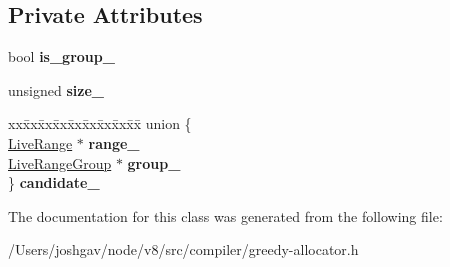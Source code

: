 \subsection*{Private Attributes}
\begin{DoxyCompactItemize}
\item 
bool {\bfseries is\+\_\+group\+\_\+}\hypertarget{classv8_1_1internal_1_1compiler_1_1_allocation_candidate_a728739b4eb20f6cd6e5f22e08bad5d4a}{}\label{classv8_1_1internal_1_1compiler_1_1_allocation_candidate_a728739b4eb20f6cd6e5f22e08bad5d4a}

\item 
unsigned {\bfseries size\+\_\+}\hypertarget{classv8_1_1internal_1_1compiler_1_1_allocation_candidate_a05cd4e6ed01b82f4a84fe2e2073fe757}{}\label{classv8_1_1internal_1_1compiler_1_1_allocation_candidate_a05cd4e6ed01b82f4a84fe2e2073fe757}

\item 
\begin{tabbing}
xx\=xx\=xx\=xx\=xx\=xx\=xx\=xx\=xx\=\kill
union \{\\
\>\hyperlink{classv8_1_1internal_1_1compiler_1_1_live_range}{LiveRange} $\ast$ {\bfseries range\_}\\
\>\hyperlink{classv8_1_1internal_1_1compiler_1_1_live_range_group}{LiveRangeGroup} $\ast$ {\bfseries group\_}\\
\} {\bfseries candidate\_}\hypertarget{classv8_1_1internal_1_1compiler_1_1_allocation_candidate_a64a5418e7043df0a4a86faca9854cca7}{}\label{classv8_1_1internal_1_1compiler_1_1_allocation_candidate_a64a5418e7043df0a4a86faca9854cca7}
\\

\end{tabbing}\end{DoxyCompactItemize}


The documentation for this class was generated from the following file\+:\begin{DoxyCompactItemize}
\item 
/\+Users/joshgav/node/v8/src/compiler/greedy-\/allocator.\+h\end{DoxyCompactItemize}
